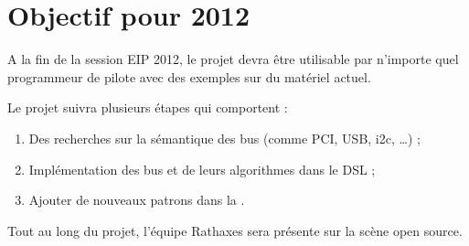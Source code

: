 \section{Objectif pour 2012}

A la fin de la session EIP 2012, le projet devra être utilisable par n'importe
quel programmeur de pilote avec des exemples sur du matériel actuel.

Le projet suivra plusieurs étapes qui comportent :
\begin{enumerate}
\item Des recherches sur la sémantique des bus (comme PCI, USB, i2c, \ldots) ;
\item Implémentation des bus et de leurs algorithmes dans le DSL ;
\item Ajouter de nouveaux patrons dans la \BL.
\end{enumerate}

Tout au long du projet, l'équipe Rathaxes sera présente sur la scène open
source.
